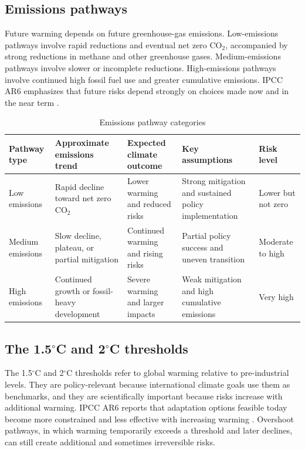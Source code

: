 \documentclass[12pt]{article}
\begin{document}
\subsection{Emissions pathways}

Future warming depends on future greenhouse-gas emissions. Low-emissions pathways involve rapid reductions and eventual net zero CO$_2$, accompanied by strong reductions in methane and other greenhouse gases. Medium-emissions pathways involve slower or incomplete reductions. High-emissions pathways involve continued high fossil fuel use and greater cumulative emissions. IPCC AR6 emphasizes that future risks depend strongly on choices made now and in the near term \cite{ref1,ref7}.

\begin{table}[htbp]
\centering
\caption{Emissions pathway categories}
\begin{tabularx}{\textwidth}{p{2.8cm}Y Y Y p{2.2cm}}
\toprule
Pathway type & Approximate emissions trend & Expected climate outcome & Key assumptions & Risk level \\
\midrule
Low emissions & Rapid decline toward net zero CO$_2$ & Lower warming and reduced risks & Strong mitigation and sustained policy implementation & Lower but not zero \\
Medium emissions & Slow decline, plateau, or partial mitigation & Continued warming and rising risks & Partial policy success and uneven transition & Moderate to high \\
High emissions & Continued growth or fossil-heavy development & Severe warming and larger impacts & Weak mitigation and high cumulative emissions & Very high \\
\bottomrule
\end{tabularx}
\end{table}

\subsection{The 1.5$^\circ$C and 2$^\circ$C thresholds}

The 1.5$^\circ$C and 2$^\circ$C thresholds refer to global warming relative to pre-industrial levels. They are policy-relevant because international climate goals use them as benchmarks, and they are scientifically important because risks increase with additional warming. IPCC AR6 reports that adaptation options feasible today become more constrained and less effective with increasing warming \cite{ref1}. Overshoot pathways, in which warming temporarily exceeds a threshold and later declines, can still create additional and sometimes irreversible risks.
\end{document}
